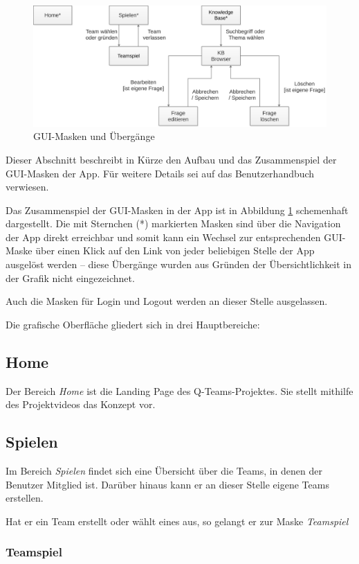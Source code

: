 \documentclass[a4paper,11pt,listof=numbered,glossary=totoc,parskip=half,toc=bib]{scrreprt}
\begin{document}
	\begin{figure}
		\centering
		\includegraphics[width=\textwidth]{gui.png}
		\caption{GUI-Masken und Übergänge}
		\label{fig:gui}
	\end{figure}
	
	Dieser Abschnitt beschreibt in Kürze den Aufbau und das Zusammenspiel der GUI-Masken der App. Für weitere Details sei auf das Benutzerhandbuch verwiesen.
	
	Das Zusammenspiel der GUI-Masken in der App ist in Abbildung \ref{fig:gui} schemenhaft dargestellt. Die mit Sternchen (*) markierten Masken sind über die Navigation der App direkt erreichbar und somit kann ein Wechsel zur entsprechenden GUI-Maske über einen Klick auf den Link von jeder beliebigen Stelle der App ausgelöst werden -- diese Übergänge wurden aus Gründen der Übersichtlichkeit in der Grafik nicht eingezeichnet.
	
	Auch die Masken für Login und Logout werden an dieser Stelle ausgelassen.
	
	Die grafische Oberfläche gliedert sich in drei Hauptbereiche:
		
	\subsection{Home}
	Der Bereich \textit{Home} ist die Landing Page des Q-Teams-Projektes. Sie stellt mithilfe des Projektvideos das Konzept vor.

	\subsection{Spielen}
	Im Bereich \textit{Spielen} findet sich eine Übersicht über die Teams, in denen der Benutzer Mitglied ist. Darüber hinaus kann er an dieser Stelle eigene Teams erstellen.
	
	Hat er ein Team erstellt oder wählt eines aus, so gelangt er zur Maske \textit{Teamspiel}
	
	\subsubsection{Teamspiel}	
\end{document}
